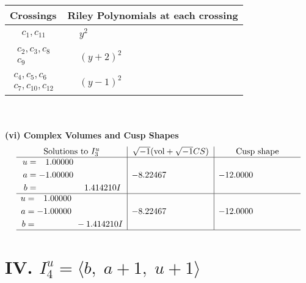 \documentclass[1p]{elsarticle_modified}
\theoremstyle{definition}
\newcommand{\I}{\sqrt{-1}}
\begin{document}
\begin{tabular}{m{50pt}|m{274pt}}
Crossings & \hspace{64pt}Riley Polynomials at each crossing \\
\hline $$\begin{aligned}c_{1},c_{11}\end{aligned}$$&$\begin{aligned}
&y^2
\end{aligned}$\\
\hline $$\begin{aligned}c_{2},c_{3},c_{8}\\c_{9}\end{aligned}$$&$\begin{aligned}
&(y+2)^2
\end{aligned}$\\
\hline $$\begin{aligned}c_{4},c_{5},c_{6}\\c_{7},c_{10},c_{12}\end{aligned}$$&$\begin{aligned}
&(y-1)^2
\end{aligned}$\\
\hline
\end{tabular}\\~\\
\newpage\flushleft \textbf{(vi) Complex Volumes and Cusp Shapes}
$$\begin{array}{c|c|c}  
\text{Solutions to }I^u_{3}& \I (\text{vol} + \sqrt{-1}CS) & \text{Cusp shape}\\
 \hline 
\begin{aligned}
u &= \phantom{-}1.00000\phantom{ +0.000000I} \\
a &= -1.00000\phantom{ +0.000000I} \\
b &= \phantom{-0.000000 -}1.414210 I\end{aligned}
 & -8.22467\phantom{ +0.000000I} & -12.0000\phantom{ +0.000000I} \\ \hline\begin{aligned}
u &= \phantom{-}1.00000\phantom{ +0.000000I} \\
a &= -1.00000\phantom{ +0.000000I} \\
b &= \phantom{-0.000000 } -1.414210 I\end{aligned}
 & -8.22467\phantom{ +0.000000I} & -12.0000\phantom{ +0.000000I}\\
 \hline 
 \end{array}$$\newpage\newpage\renewcommand{\arraystretch}{1}
\centering \section*{IV. $I^u_{4}= \langle b,\;a+1,\;u+1 \rangle$}
\end{document}

